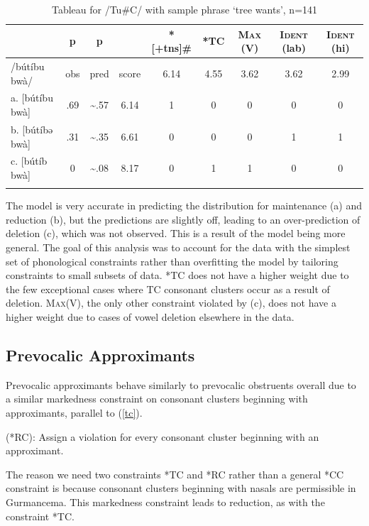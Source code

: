 \documentclass[output=paper,newtxmath,modfonts,nonflat,draftmode]{langsci/langscibook}
\begin{document}
\begin{table}
\caption{Tableau for /Tu\#C/ with sample phrase ‘tree wants’, n=141}
\label{tab:baird:4}
\begin{tabularx}{\textwidth}{Xcccccccc} 
\lsptoprule

{} &  p   &  p   &    &   *[+tns]\#   &   *TC   &   \textsc{Max} (V)   &   \textsc{Ident} (lab)   &   \textsc{Ident} (hi)  \\
\midrule
 /bútíbu bwà/ & obs & pred & score & 6.14 & 4.55 & 3.62 & 3.62 & 2.99 \\
{a. [bútíbu bwà]} & .69 & \textasciitilde .57 & 6.14 & 1 & 0 & 0 & 0 & 0\\
{b. [bútíbə bwà]} & .31 & \textasciitilde .35 & 6.61 & 0 & 0 & 0 & 1 & 1 \\
{c. [bútíb bwà]} & 0 & \textasciitilde .08 & 8.17 & 0 & 1 & 1 & 0 & 0\\

\lspbottomrule\end{tabularx}
\end{table}

The model is very accurate in predicting the distribution for maintenance (a) and reduction (b), but the predictions are slightly off, leading to an over-prediction of deletion (c), which was not observed. This is a result of the model being more general. The goal of this analysis was to account for the data with the simplest set of phonological constraints rather than overfitting the model by tailoring constraints to small subsets of data. *TC does not have a higher weight due to the few exceptional cases where TC consonant clusters occur as a result of deletion. \textsc{Max}(V), the only other constraint violated by (c), does not have a higher weight due to cases of vowel deletion elsewhere in the data. 

\subsection{Prevocalic Approximants}

Prevocalic approximants behave similarly to prevocalic obstruents overall due to a similar markedness constraint on consonant clusters beginning with approximants, parallel to (\ref{tc}). 

\ea	*[+approximant][+consonantal] (*RC): Assign a violation for every consonant 
	cluster beginning with an approximant. 
\z

The reason we need two constraints *TC and *RC rather than a general *CC constraint is because consonant clusters beginning with nasals are permissible in Gurmancema. This markedness constraint leads to reduction, as with the constraint *TC. 
\end{document}
